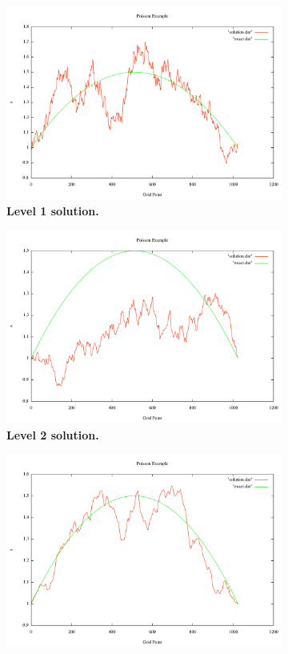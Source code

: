 \documentclass[note]{TechNote}
\begin{document}
\begin{figure}[h!]
  \centering
  \begin{subfigure}[b]{0.32\textwidth}
    \includegraphics[width=\textwidth]{7_sec_1_level.pdf}
    \caption{\textbf{Level 1 solution.}}
  \end{subfigure}
  \begin{subfigure}[b]{0.32\textwidth}
    \includegraphics[width=\textwidth]{cg_2_level.pdf}
    \caption{\textbf{Level 2 solution.}}
  \end{subfigure}
  \begin{subfigure}[b]{0.32\textwidth}
    \includegraphics[width=\textwidth]{cg_3_level.pdf}

\end{subfigure}
\end{figure}
\end{document}
